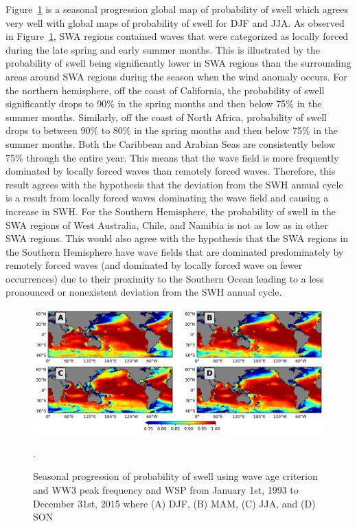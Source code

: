 \documentclass[draft,linenumbers]{agujournal2018}
\begin{document}
Figure~\ref{prob_swell_ww3} is a seasonal progression global map of probability of swell which agrees very well with \citet{semedo2011global} global maps of probability of swell for DJF and JJA. As observed in Figure~\ref{prob_swell_ww3}, SWA regions contained waves that were categorized as locally forced during the late spring and early summer months. This is illustrated by the probability of swell being significantly lower in SWA regions than the surrounding areas around SWA regions during the season when the wind anomaly occurs. For the northern hemisphere, off the coast of California, the probability of swell significantly drops to 90\% in the spring months and then below 75\% in the summer months. Similarly, off the coast of North Africa, probability of swell drops to between 90\% to 80\% in the spring months and then below 75\% in the summer months. Both the Caribbean and Arabian Seas are consistently below 75\% through the entire year. This means that the wave field is more frequently dominated by locally forced waves than remotely forced waves. Therefore, this result agrees with the hypothesis that the deviation from the SWH annual cycle is a result from locally forced waves dominating the wave field and causing a increase in SWH. For the Southern Hemisphere, the probability of swell in the SWA regions of West Australia, Chile, and Namibia is not as low as in other SWA regions. This would also agree with the hypothesis that the SWA regions in the Southern Hemisphere have wave fields that are dominated predominately by remotely forced waves (and dominated by locally forced wave on fewer occurrences) due to their proximity to the Southern Ocean leading to a less pronounced or nonexistent deviation from the SWH annual cycle. 

\begin{figure}[tbh]
\centering
\includegraphics[width=1.0\textwidth]{figs/probability_of_swell/WW3_CFSR_prob_swell_seasons_2x2.png}
\caption{Seasonal progression of probability of swell using wave age criterion and WW3 peak frequency and WSP from January 1st, 1993 to December 31st, 2015 where (A) DJF, (B) MAM, (C) JJA, and (D) SON}.
\label{prob_swell_ww3}
\end{figure}
\end{document}
